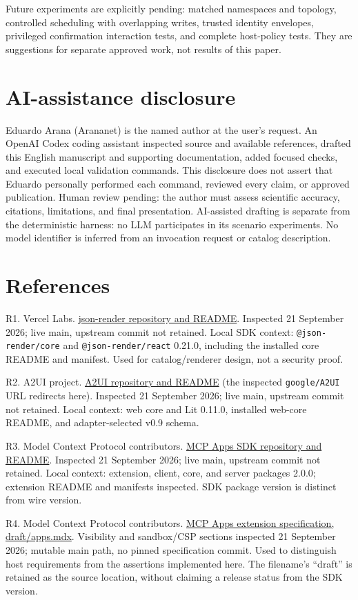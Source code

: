 \documentclass[11pt]{article}
\begin{document}
Future experiments are explicitly pending: matched namespaces and
topology, controlled scheduling with overlapping writes, trusted
identity envelopes, privileged confirmation interaction tests, and
complete host-policy tests. They are suggestions for separate approved
work, not results of this paper.

\section{AI-assistance disclosure}\label{ai-assistance-disclosure}

Eduardo Arana (Arananet) is the named author at the user's request. An
OpenAI Codex coding assistant inspected source and available references,
drafted this English manuscript and supporting documentation, added
focused checks, and executed local validation commands. This disclosure
does not assert that Eduardo personally performed each command, reviewed
every claim, or approved publication. Human review pending: the author
must assess scientific accuracy, citations, limitations, and final
presentation. AI-assisted drafting is separate from the deterministic
harness: no LLM participates in its scenario experiments. No model
identifier is inferred from an invocation request or catalog
description.

\section{References}\label{references}

R1. Vercel Labs.
\href{https://github.com/vercel-labs/json-render}{json-render repository
and README}. Inspected 21 September 2026; live main, upstream commit not
retained. Local SDK context: \texttt{@json-render/core} and
\texttt{@json-render/react} 0.21.0, including the installed core README
and manifest. Used for catalog/renderer design, not a security proof.

R2. A2UI project. \href{https://github.com/a2ui-project/a2ui}{A2UI
repository and README} (the inspected \texttt{google/A2UI} URL redirects
here). Inspected 21 September 2026; live main, upstream commit not
retained. Local context: web core and Lit 0.11.0, installed web-core
README, and adapter-selected v0.9 schema.

R3. Model Context Protocol contributors.
\href{https://github.com/modelcontextprotocol/ext-apps}{MCP Apps SDK
repository and README}. Inspected 21 September 2026; live main, upstream
commit not retained. Local context: extension, client, core, and server
packages 2.0.0; extension README and manifests inspected. SDK package
version is distinct from wire version.

R4. Model Context Protocol contributors.
\href{https://github.com/modelcontextprotocol/ext-apps/blob/main/specification/draft/apps.mdx}{MCP
Apps extension specification, draft/apps.mdx}. Visibility and
sandbox/CSP sections inspected 21 September 2026; mutable main path, no
pinned specification commit. Used to distinguish host requirements from
the assertions implemented here. The filename's ``draft'' is retained as
the source location, without claiming a release status from the SDK
version.
\end{document}
